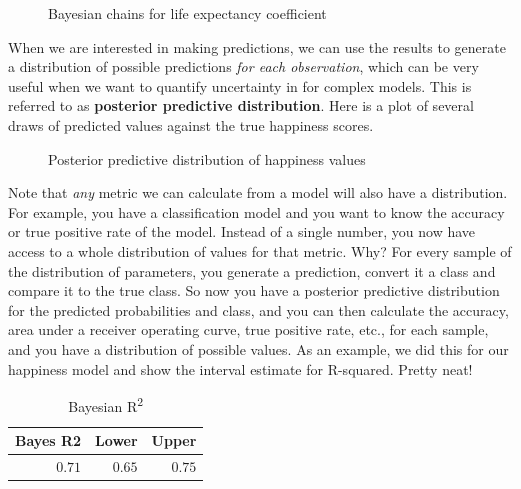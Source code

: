 \documentclass[
  letterpaper,
]{krantz}
\begin{document}
\begin{figure}[H]


\caption{\label{fig-r-bayesian-chains}Bayesian chains for life
expectancy coefficient}

\end{figure}%

When we are interested in making predictions, we can use the results to
generate a distribution of possible predictions \emph{for each
observation}, which can be very useful when we want to quantify
uncertainty in for complex models. This is referred to as
\textbf{posterior predictive distribution}. Here is a plot of several
draws of predicted values against the true happiness scores.

\begin{figure}[H]


\caption{\label{fig-r-bayesian-posterior-predictive}Posterior predictive
distribution of happiness values}

\end{figure}%

Note that \emph{any} metric we can calculate from a model will also have
a distribution. For example, you have a classification model and you
want to know the accuracy or true positive rate of the model. Instead of
a single number, you now have access to a whole distribution of values
for that metric. Why? For every sample of the distribution of
parameters, you generate a prediction, convert it a class and compare it
to the true class. So now you have a posterior predictive distribution
for the predicted probabilities and class, and you can then calculate
the accuracy, area under a receiver operating curve, true positive rate,
etc., for each sample, and you have a distribution of possible values.
As an example, we did this for our happiness model and show the interval
estimate for R-squared. Pretty neat!

\setlength{\LTpost}{0mm}

\begin{longtable}{rrr}

\caption{\label{tbl-r-bayesian-metrics}Bayesian R\textsuperscript{2}}

\tabularnewline

\toprule
Bayes R2 & Lower & Upper \\ 
\midrule\addlinespace[2.5pt]
\textcolor[HTML]{404040}{$0.71$} & \textcolor[HTML]{404040}{$0.65$} & \textcolor[HTML]{404040}{$0.75$} \\ 
\bottomrule

\end{longtable}
\end{document}
